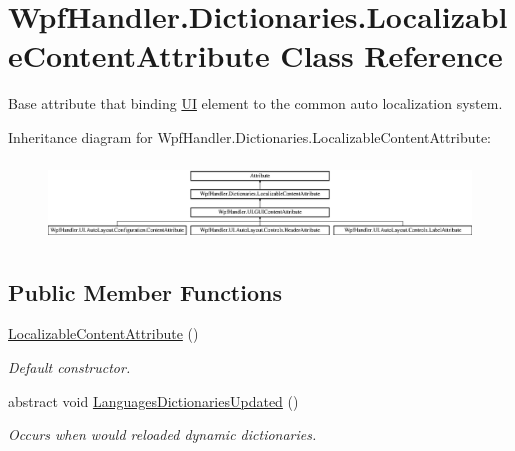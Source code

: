 \hypertarget{class_wpf_handler_1_1_dictionaries_1_1_localizable_content_attribute}{}\section{Wpf\+Handler.\+Dictionaries.\+Localizable\+Content\+Attribute Class Reference}
\label{class_wpf_handler_1_1_dictionaries_1_1_localizable_content_attribute}


Base attribute that binding \mbox{\hyperlink{namespace_wpf_handler_1_1_u_i}{UI}} element to the common auto localization system.  


Inheritance diagram for Wpf\+Handler.\+Dictionaries.\+Localizable\+Content\+Attribute\+:\begin{figure}[H]
\begin{center}
\leavevmode
\includegraphics[height=2.170543cm]{db/dbf/class_wpf_handler_1_1_dictionaries_1_1_localizable_content_attribute}
\end{center}
\end{figure}
\subsection*{Public Member Functions}
\begin{DoxyCompactItemize}
\item 
\mbox{\hyperlink{class_wpf_handler_1_1_dictionaries_1_1_localizable_content_attribute_abba3c6699a97cc5a417eebc194979acd}{Localizable\+Content\+Attribute}} ()
\begin{DoxyCompactList}\small\item\em Default constructor. \end{DoxyCompactList}\item 
abstract void \mbox{\hyperlink{class_wpf_handler_1_1_dictionaries_1_1_localizable_content_attribute_a001e110c7ad42422bc02a44d9eedc801}{Languages\+Dictionaries\+Updated}} ()
\begin{DoxyCompactList}\small\item\em Occurs when would reloaded dynamic dictionaries. \end{DoxyCompactList}\end{DoxyCompactItemize}
